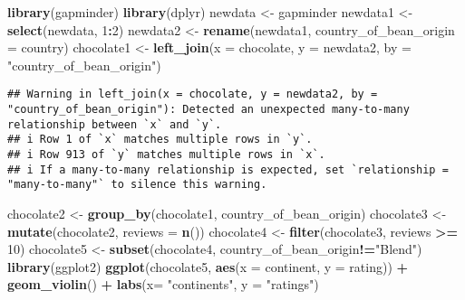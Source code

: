 \documentclass[
]{article}
\newenvironment{Shaded}{\begin{snugshade}}{\end{snugshade}}
\newcommand{\AttributeTok}[1]{\textcolor[rgb]{0.13,0.29,0.53}{#1}}
\newcommand{\DecValTok}[1]{\textcolor[rgb]{0.00,0.00,0.81}{#1}}
\newcommand{\FunctionTok}[1]{\textcolor[rgb]{0.13,0.29,0.53}{\textbf{#1}}}
\newcommand{\NormalTok}[1]{#1}
\newcommand{\OtherTok}[1]{\textcolor[rgb]{0.56,0.35,0.01}{#1}}
\newcommand{\SpecialCharTok}[1]{\textcolor[rgb]{0.81,0.36,0.00}{\textbf{#1}}}
\newcommand{\StringTok}[1]{\textcolor[rgb]{0.31,0.60,0.02}{#1}}
\begin{document}
\begin{Shaded}
\begin{Highlighting}[]
\FunctionTok{library}\NormalTok{(gapminder)}
\FunctionTok{library}\NormalTok{(dplyr)}
\NormalTok{newdata }\OtherTok{\textless{}{-}}\NormalTok{ gapminder}
\NormalTok{newdata1 }\OtherTok{\textless{}{-}} \FunctionTok{select}\NormalTok{(newdata, }\DecValTok{1}\SpecialCharTok{:}\DecValTok{2}\NormalTok{)}
\NormalTok{newdata2 }\OtherTok{\textless{}{-}} \FunctionTok{rename}\NormalTok{(newdata1, }\AttributeTok{country\_of\_bean\_origin =}\NormalTok{ country)}
\NormalTok{chocolate1 }\OtherTok{\textless{}{-}} \FunctionTok{left\_join}\NormalTok{(}\AttributeTok{x =}\NormalTok{ chocolate, }\AttributeTok{y =}\NormalTok{ newdata2, }\AttributeTok{by =} \StringTok{"country\_of\_bean\_origin"}\NormalTok{)}
\end{Highlighting}
\end{Shaded}

\begin{verbatim}
## Warning in left_join(x = chocolate, y = newdata2, by = "country_of_bean_origin"): Detected an unexpected many-to-many relationship between `x` and `y`.
## i Row 1 of `x` matches multiple rows in `y`.
## i Row 913 of `y` matches multiple rows in `x`.
## i If a many-to-many relationship is expected, set `relationship = "many-to-many"` to silence this warning.
\end{verbatim}

\begin{Shaded}
\begin{Highlighting}[]
\NormalTok{chocolate2 }\OtherTok{\textless{}{-}} \FunctionTok{group\_by}\NormalTok{(chocolate1, country\_of\_bean\_origin)}
\NormalTok{chocolate3 }\OtherTok{\textless{}{-}} \FunctionTok{mutate}\NormalTok{(chocolate2, }\AttributeTok{reviews =} \FunctionTok{n}\NormalTok{())}
\NormalTok{chocolate4 }\OtherTok{\textless{}{-}} \FunctionTok{filter}\NormalTok{(chocolate3, reviews }\SpecialCharTok{\textgreater{}=} \DecValTok{10}\NormalTok{)}
\NormalTok{chocolate5 }\OtherTok{\textless{}{-}} \FunctionTok{subset}\NormalTok{(chocolate4, country\_of\_bean\_origin}\SpecialCharTok{!=}\StringTok{"Blend"}\NormalTok{)}
\FunctionTok{library}\NormalTok{(ggplot2)}
\FunctionTok{ggplot}\NormalTok{(chocolate5, }\FunctionTok{aes}\NormalTok{(}\AttributeTok{x =}\NormalTok{ continent, }\AttributeTok{y =}\NormalTok{ rating)) }\SpecialCharTok{+} \FunctionTok{geom\_violin}\NormalTok{() }\SpecialCharTok{+} \FunctionTok{labs}\NormalTok{(}\AttributeTok{x=} \StringTok{"continents"}\NormalTok{, }\AttributeTok{y =} \StringTok{"ratings"}\NormalTok{)}
\end{Highlighting}
\end{Shaded}
\end{document}
